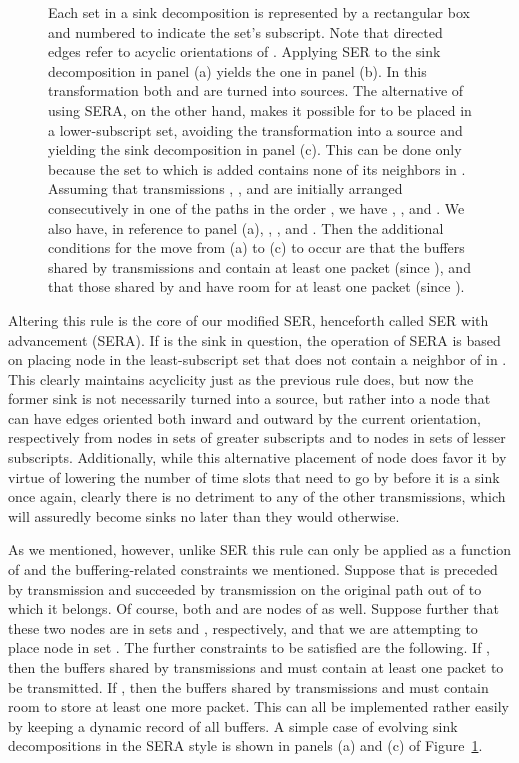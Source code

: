\documentclass{article}
\begin{document}
\begin{figure}[t]
\centering
{}
\caption{
Each set in a sink decomposition is represented by a rectangular box and
numbered to indicate the set's subscript. Note that directed edges refer to
acyclic orientations of . Applying SER to the sink decomposition in panel (a)
yields the one in panel (b). In this transformation both  and  are turned
into sources. The alternative of using SERA, on the other hand, makes it
possible for  to be placed in a lower-subscript set, avoiding the
transformation into a source and yielding the sink decomposition in panel (c).
This can be done only because the set to which  is added contains none of its
neighbors in . Assuming that transmissions , , and  are initially
arranged consecutively in one of the  paths in the order , we have
, , and . We also have, in reference to panel (a), ,
, and . Then the additional conditions for the move from (a) to (c)
to occur are that the buffers shared by transmissions  and  contain at
least one packet (since ), and that those shared by  and  have room
for at least one packet (since ).}
\label{fig6}
\end{figure}

Altering this rule is the core of our modified SER, henceforth called SER with
advancement (SERA). If  is the sink in question, the operation of SERA is
based on placing node  in the least-subscript set that does not contain a
neighbor of  in . This clearly maintains acyclicity just as the previous
rule does, but now the former sink is not necessarily turned into a source, but
rather into a node that can have edges oriented both inward and outward by the
current orientation, respectively from nodes in sets of greater subscripts and
to nodes in sets of lesser subscripts. Additionally, while this alternative
placement of node  does favor it by virtue of lowering the number of time
slots that need to go by before it is a sink once again, clearly there is no
detriment to any of the other transmissions, which will assuredly become sinks
no later than they would otherwise.

As we mentioned, however, unlike SER this rule can only be applied as a function
of  and the buffering-related constraints we mentioned. Suppose that  is
preceded by transmission  and succeeded by transmission  on the
original path out of  to which
it belongs. Of course, both  and  are nodes of  as well. Suppose
further that these two nodes are in sets  and , respectively,
and that we are attempting to place node  in set . The further
constraints to be satisfied are the following. If , then the buffers
shared by transmissions  and  must contain at least one packet to be
transmitted. If , then the buffers shared by transmissions  and 
must contain room to store at least one more packet. This can all be implemented
rather easily by keeping a dynamic record of all buffers. A simple case of
evolving sink decompositions in the SERA style is shown in panels (a) and (c) of
Figure~\ref{fig6}.
\end{document}
